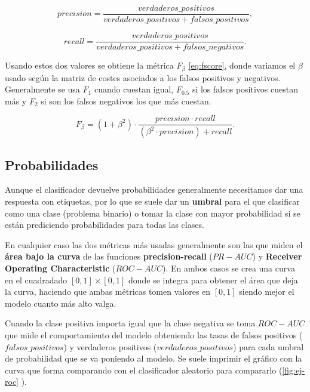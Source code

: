 \begin{equation}
  precision = \dfrac{verdaderos\_positivos}{verdaderos\_positivos + falsos\_positivos},
  \label{eq:precision}
\end{equation}

\begin{equation}
  recall = \dfrac{verdaderos\_positivos}{verdaderos\_positivos + falsos\_negativos}.
  \label{eq:recall}
\end{equation}

Usando estos dos valores se obtiene la métrica $F_\beta$ \eqref{eq:fscore}, donde variamos el $\beta$ usado según la matriz de costes asociados a los falsos positivos y negativos. Generalmente se usa $F_1$ cuando cuestan igual, $F_{0.5}$ si los falsos positivos cuestan más y $F_{2}$ si son los falsos negativos los que más cuestan.

\begin{equation}
  F_\beta = (1 + \beta^2) \cdot \dfrac{precision \cdot recall}{(\beta^2 \cdot precision) + recall}.
  \label{eq:fscore}
\end{equation}

\subsection{Probabilidades}

Aunque el clasificador devuelve probabilidades generalmente necesitamos dar una respuesta con etiquetas, por lo que se suele dar un \textbf{umbral} para el que clasificar como una clase (problema binario) o tomar la clase con mayor probabilidad si se están prediciendo probabilidades para todas las clases.

En cualquier caso las dos métricas más usadas generalmente son las que miden el \textbf{área bajo la curva} de las funciones \textbf{precision-recall} ($PR-AUC$) y \textbf{Receiver Operating Characteristic} ($ROC-AUC$). En ambos casos se crea una curva en el cuadradado $[0,1] \times [0,1]$ donde se integra para obtener el área que deja la curva, haciendo que ambas métricas tomen valores en $[0, 1]$ siendo mejor el modelo cuanto más alto valga.

Cuando la clase positiva importa igual que la clase negativa se toma $ROC-AUC$ que mide el comportamiento del modelo obteniendo las tasas de falsos positivos ($falsos\_positivos$) y verdaderos positivos ($verdaderos\_positivos$) para cada umbral de probabilidad que se va poniendo al modelo. Se suele imprimir el gráfico con la curva que forma comparando con el clasificador aleatorio para compararlo (\autoref{fig:ej-roc} \cite{scikit2020roc}).

